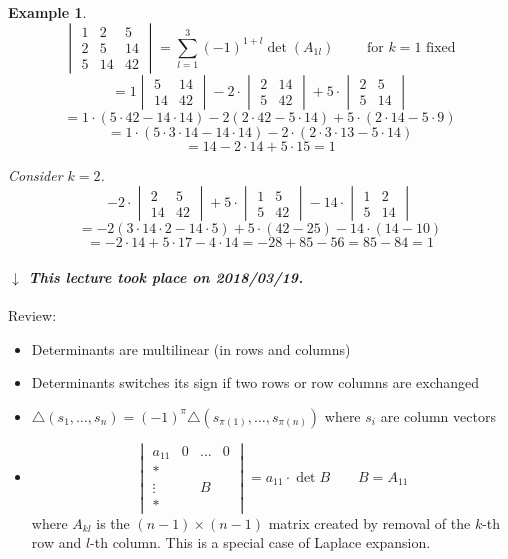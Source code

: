 \documentclass[a4paper]{article}
\newcounter{lecref}[section]
\numberwithin{lecref}{section}
\newtheorem{example}[lecref]{Example}
\newcommand{\dateref}[1]{%
  \begin{mdframed}[backgroundcolor=gray!10,innerbottommargin=0pt,innertopmargin=0pt]
    \paragraph{\textit{$\downarrow$ This lecture took place on #1.}}%
  \end{mdframed}%
}
\begin{document}
\begin{example} %
  \[
    \begin{vmatrix}
      1 & 2 & 5 \\
      2 & 5 & 14 \\
      5 & 14 & 42
    \end{vmatrix}
    = \sum_{l=1}^3 (-1)^{1+l} \det(A_{1l})
    \qquad \text{ for $k=1$ fixed}
  \]
  \[ = 1 \begin{vmatrix} 5 & 14 \\ 14 & 42 \end{vmatrix} - 2 \cdot \begin{vmatrix} 2 & 14 \\ 5 & 42 \end{vmatrix} + 5 \cdot \begin{vmatrix} 2 & 5 \\ 5 & 14 \end{vmatrix} \]
  \[ = 1 \cdot (5 \cdot 42 - 14 \cdot 14) - 2 (2 \cdot 42 - 5 \cdot 14) + 5 \cdot (2 \cdot 14 - 5 \cdot 9) \]
  \[ = 1 \cdot (5 \cdot 3 \cdot 14 - 14 \cdot 14) - 2 \cdot (2 \cdot 3 \cdot 13 - 5 \cdot 14) \]
  \[ = 14 - 2 \cdot 14 + 5 \cdot 15 = 1 \]

  Consider $k=2$.
  \[
    -2 \cdot \begin{vmatrix} 2 & 5 \\ 14 & 42 \end{vmatrix} + 5 \cdot \begin{vmatrix} 1 & 5 \\ 5 & 42 \end{vmatrix} - 14 \cdot \begin{vmatrix} 1 & 2 \\ 5 & 14 \end{vmatrix}
  \] \[
    = -2 (3 \cdot 14 \cdot 2 - 14 \cdot 5) + 5 \cdot (42 - 25) - 14 \cdot (14 - 10)
  \] \[
    = -2 \cdot 14 + 5 \cdot 17 - 4 \cdot 14 = -28 +85 -56 = 85 - 84 = 1
  \]
\end{example}

\dateref{2018/03/19}

Review:
\begin{itemize}
  \item Determinants are multilinear (in rows and columns)
  \item Determinants switches its sign if two rows or row columns are exchanged
  \item $\triangle(s_1, \dots, s_n) = (-1)^\pi \triangle(s_{\pi(1)}, \dots, s_{\pi(n)})$ where $s_i$ are column vectors
  \item
    \[
      \begin{vmatrix}
        a_{11} & 0 & \dots & 0 \\
        * &        &       & \\
        \vdots &   &  B    & \\
        * &        &       &
      \end{vmatrix}
      = a_{11} \cdot \det{B}
      \qquad B = A_{11}
    \]
    where $A_{kl}$ is the $(n-1) \times (n-1)$ matrix created by removal of the $k$-th row and $l$-th column.
    This is a special case of Laplace expansion.
\end{itemize}
\end{document}
